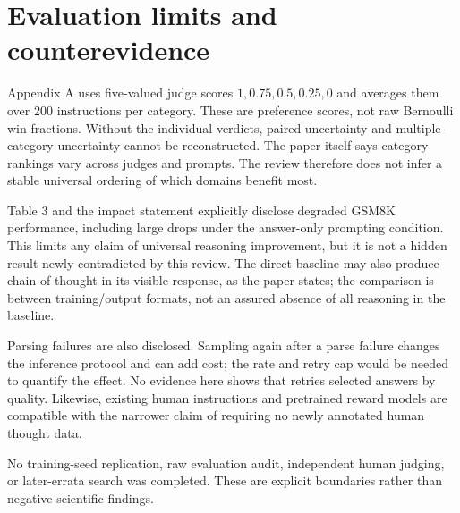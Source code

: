 \documentclass[10pt]{article}
\begin{document}
\section*{Evaluation limits and counterevidence}
Appendix A uses five-valued judge scores \(1,0.75,0.5,0.25,0\) and averages them over 200 instructions per category. These are preference scores, not raw Bernoulli win fractions. Without the individual verdicts, paired uncertainty and multiple-category uncertainty cannot be reconstructed. The paper itself says category rankings vary across judges and prompts. The review therefore does not infer a stable universal ordering of which domains benefit most.\par
Table 3 and the impact statement explicitly disclose degraded GSM8K performance, including large drops under the answer-only prompting condition. This limits any claim of universal reasoning improvement, but it is not a hidden result newly contradicted by this review. The direct baseline may also produce chain-of-thought in its visible response, as the paper states; the comparison is between training/output formats, not an assured absence of all reasoning in the baseline.\par
Parsing failures are also disclosed. Sampling again after a parse failure changes the inference protocol and can add cost; the rate and retry cap would be needed to quantify the effect. No evidence here shows that retries selected answers by quality. Likewise, existing human instructions and pretrained reward models are compatible with the narrower claim of requiring no newly annotated human thought data.\par
No training-seed replication, raw evaluation audit, independent human judging, or later-errata search was completed. These are explicit boundaries rather than negative scientific findings.\par
\end{document}
